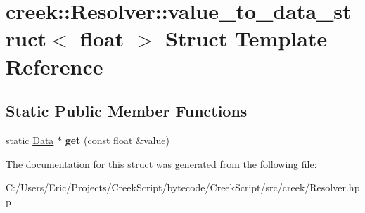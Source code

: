 \hypertarget{structcreek_1_1_resolver_1_1value__to__data__struct_3_01float_01_4}{}\section{creek\+:\+:Resolver\+:\+:value\+\_\+to\+\_\+data\+\_\+struct$<$ float $>$ Struct Template Reference}
\label{structcreek_1_1_resolver_1_1value__to__data__struct_3_01float_01_4}
\subsection*{Static Public Member Functions}
\begin{DoxyCompactItemize}
\item 
static \hyperlink{classcreek_1_1_data}{Data} $\ast$ {\bfseries get} (const float \&value)\hypertarget{structcreek_1_1_resolver_1_1value__to__data__struct_3_01float_01_4_a81296eb5378c1c8de9777a6be9665c96}{}\label{structcreek_1_1_resolver_1_1value__to__data__struct_3_01float_01_4_a81296eb5378c1c8de9777a6be9665c96}

\end{DoxyCompactItemize}


The documentation for this struct was generated from the following file\+:\begin{DoxyCompactItemize}
\item 
C\+:/\+Users/\+Eric/\+Projects/\+Creek\+Script/bytecode/\+Creek\+Script/src/creek/Resolver.\+hpp\end{DoxyCompactItemize}
